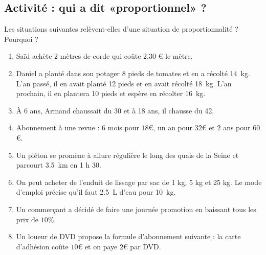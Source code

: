 
\subsection*{Activité : qui a dit «proportionnel» ?}

Les situations suivantes relèvent-elles d’une situation de proportionnalité ? Pourquoi ?
\begin{enumerate}
    \item

 Saïd achète 2 mètres de corde qui coûte 2,30 € le mètre.

\item
    Daniel a planté dans son potager 8 pieds de tomates et en a récolté \SI{14}{\kilo\gram}. L'an passé, il en avait planté 12 pieds et en avait récolté \SI{18}{\kilo\gram}. L'an prochain, il en plantera 10 pieds et espère en récolter \SI{16}{\kilo\gram}. 

\item
 À 6 ans, Armand chaussait du 30 et à 18 ans, il chausse du 42.
\item

 Abonnement à une revue : \( 6\) mois pour \( 18\)€, un an pour \( 32\)€ et \( 2\) ans pour \( 60\)€.
\item
    Un piéton se promène à allure régulière le long des quais de la Seine et parcourt \SI{3.5}{\kilo\meter} en 1 h 30.
\item

    On peut acheter de l'enduit de lissage par sac de 1 kg, 5 kg et 25 kg. Le mode d’emploi précise qu'il faut \SI{2.5}{\liter} d’eau pour \SI{10}{\kilo\gram}.
\item

 Un commerçant a décidé de faire une journée promotion en baissant tous les prix de $10$\%.
\item

 Un loueur de DVD propose la formule d'abonnement suivante : la carte d'adhésion coûte $10$€ et on paye $2$€ par DVD.

\end{enumerate}
